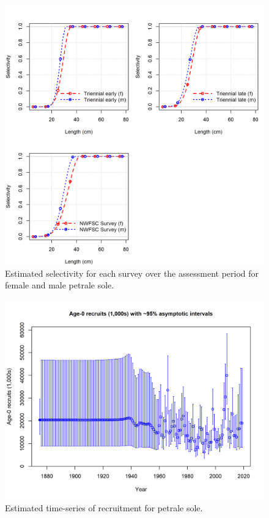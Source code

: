 \documentclass[12pt,]{article}
\begin{document}
\FloatBarrier

\begin{figure}
\centering
\includegraphics{Figures/Petrale_survey_selectivity.png}
\caption{Estimated selectivity for each survey over the assessment
period for female and male petrale sole. \label{fig:survey_selex}}
\end{figure}

\FloatBarrier

\begin{figure}
\centering
\includegraphics{r4ss/plots_mod1/ts11_Age-0_recruits_(1000s)_with_95_asymptotic_intervals.png}
\caption{Estimated time-series of recruitment for petrale sole.
\label{fig:recruits}}
\end{figure}
\end{document}
